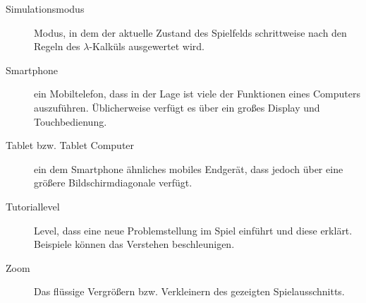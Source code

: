 \begin{description}
	\item[Simulationsmodus] Modus, in dem der aktuelle Zustand des Spielfelds schrittweise nach den Regeln des \(\lambda\)-Kalküls ausgewertet wird.
	\item[Smartphone] ein Mobiltelefon, dass in der Lage ist viele der Funktionen eines Computers auszuführen. Üblicherweise verfügt es über ein großes Display und Touchbedienung.
	\item[Tablet bzw. Tablet Computer] ein dem Smartphone ähnliches mobiles Endgerät, dass jedoch über eine größere Bildschirmdiagonale verfügt.
	\item[Tutoriallevel] Level, dass eine neue Problemstellung im Spiel einführt und diese erklärt. Beispiele können das Verstehen beschleunigen.
	\item[Zoom] Das flüssige Vergrößern bzw. Verkleinern des gezeigten Spielausschnitts.
	
	
	
\end{description}
